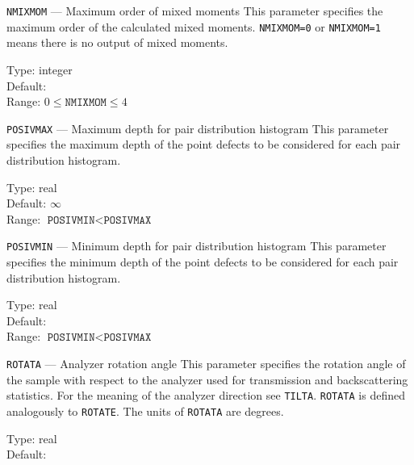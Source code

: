 \begin{keydescription}{\texttt{NMIXMOM} --- Maximum order of mixed moments}
%
  This parameter specifies the maximum order of the calculated mixed moments.
  \texttt{NMIXMOM=0} or \texttt{NMIXMOM=1} means there is no output of mixed moments. 
  \begin{keytab}
    Type:    \> integer \\
    Default:  \\
    Range:   \> $0 \le \texttt{NMIXMOM} \le 4$
  \end{keytab}
\end{keydescription}

\begin{keydescription}{\texttt{POSIVMAX} --- Maximum depth for pair distribution histogram}
%
  This parameter specifies the maximum depth of the point defects to be considered for each 
  pair distribution histogram.
  \begin{keytab}
    Type:    \> real \\
    Default: \> $\infty$ \\
    Range:   \> $\texttt{POSIVMIN} < \texttt{POSIVMAX}$
  \end{keytab}
\end{keydescription}

\begin{keydescription}{\texttt{POSIVMIN} --- Minimum depth for pair distribution histogram}
%
  This parameter specifies the minimum depth of the point defects to be considered for each 
  pair distribution histogram.
  \begin{keytab}
    Type:    \> real \\
    Default:  \\
    Range:   \> $\texttt{POSIVMIN} < \texttt{POSIVMAX}$
  \end{keytab}
\end{keydescription}

\begin{keydescription}{\texttt{ROTATA} --- Analyzer rotation angle}
%
  This parameter specifies the rotation angle of the sample with respect to the analyzer used 
  for transmission and backscattering statistics. For the meaning of the analyzer direction see
  \texttt{TILTA}. {\tt ROTATA} is defined analogously to \texttt{ROTATE}. The units of 
  \texttt{ROTATA} are degrees.
  \begin{keytab}
    Type:    \> real \\
    Default:  
  \end{keytab}
\end{keydescription}


